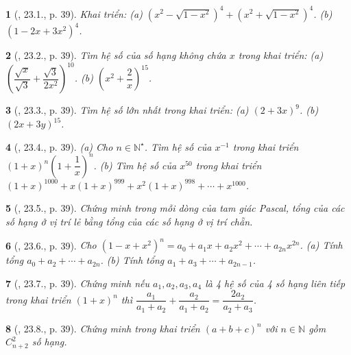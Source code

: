 \documentclass{article}
\newtheorem{baitoan}{}
\begin{document}
\begin{baitoan}[\cite{Hai_Hung_Thu_Tung_ncpt_Toan_10_tap_2}, 23.1., p. 39]
	Khai triển: (a) $(x^2 - \sqrt{1 - x^2})^4 + (x^2 + \sqrt{1 - x^2})^4$. (b) $(1 - 2x + 3x^2)^4$.
\end{baitoan}

\begin{baitoan}[\cite{Hai_Hung_Thu_Tung_ncpt_Toan_10_tap_2}, 23.2., p. 39]
	Tìm hệ số của số hạng không chứa $x$ trong khai triển: (a) $\left(\dfrac{\sqrt{x}}{\sqrt{3}} + \dfrac{\sqrt{3}}{2x^2}\right)^{10}$. (b) $\left(x^2 + \dfrac{2}{x}\right)^{15}$.
\end{baitoan}

\begin{baitoan}[\cite{Hai_Hung_Thu_Tung_ncpt_Toan_10_tap_2}, 23.3., p. 39]
	Tìm hệ số lớn nhất trong khai triển: (a) $(2 + 3x)^9$. (b) $(2x + 3y)^{15}$.
\end{baitoan}

\begin{baitoan}[\cite{Hai_Hung_Thu_Tung_ncpt_Toan_10_tap_2}, 23.4., p. 39]
	(a) Cho $n\in\mathbb{N}^\star$. Tìm hệ số của $x^{-1}$ trong khai triển $(1 + x)^n\left(1 + \dfrac{1}{x}\right)^n$. (b) Tìm hệ số của $x^{50}$ trong khai triển $(1 + x)^{1000} + x(1 + x)^{999} + x^2(1 + x)^{998} + \cdots + x^{1000}$.
\end{baitoan}

\begin{baitoan}[\cite{Hai_Hung_Thu_Tung_ncpt_Toan_10_tap_2}, 23.5., p. 39]
	Chứng minh trong mỗi dòng của tam giác Pascal, tổng của các số hạng ở vị trí lẻ bằng tổng của các số hạng ở vị trí chẵn.
\end{baitoan}

\begin{baitoan}[\cite{Hai_Hung_Thu_Tung_ncpt_Toan_10_tap_2}, 23.6., p. 39]
	Cho $(1 - x + x^2)^n = a_0 + a_1x + a_2x^2 + \cdots + a_{2n}x^{2n}$. (a) Tính tổng $a_0 + a_2 + \cdots + a_{2n}$. (b) Tính tổng $a_1 + a_3 + \cdots + a_{2n - 1}$.
\end{baitoan}

\begin{baitoan}[\cite{Hai_Hung_Thu_Tung_ncpt_Toan_10_tap_2}, 23.7., p. 39]
	Chứng minh nếu $a_1,a_2,a_3,a_4$ là 4 hệ số của 4 số hạng liên tiếp trong khai triển $(1 + x)^n$ thì $\dfrac{a_1}{a_1 + a_2} + \dfrac{a_2}{a_1 + a_2} = \dfrac{2a_2}{a_2 + a_3}$.
\end{baitoan}

\begin{baitoan}[\cite{Hai_Hung_Thu_Tung_ncpt_Toan_10_tap_2}, 23.8., p. 39]
	Chứng minh trong khai triển $(a + b + c)^n$ với $n\in\mathbb{N}$ gồm $C_{n + 2}^2$ số hạng.
\end{baitoan}
\end{document}
